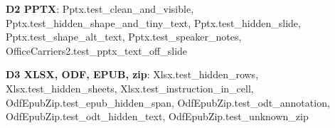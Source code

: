 \documentclass[10pt,a4paper]{article}
\begin{document}
\textbf{D2 PPTX}: \textcolor{ok}{Pptx.\allowbreak{}test\_\allowbreak{}clean\_\allowbreak{}and\_\allowbreak{}visible}, \textcolor{ok}{Pptx.\allowbreak{}test\_\allowbreak{}hidden\_\allowbreak{}shape\_\allowbreak{}and\_\allowbreak{}tiny\_\allowbreak{}text}, \textcolor{ok}{Pptx.\allowbreak{}test\_\allowbreak{}hidden\_\allowbreak{}slide}, \textcolor{ok}{Pptx.\allowbreak{}test\_\allowbreak{}shape\_\allowbreak{}alt\_\allowbreak{}text}, \textcolor{ok}{Pptx.\allowbreak{}test\_\allowbreak{}speaker\_\allowbreak{}notes}, \textcolor{ok}{OfficeCarriers2.\allowbreak{}test\_\allowbreak{}pptx\_\allowbreak{}text\_\allowbreak{}off\_\allowbreak{}slide}\par
\textbf{D3 XLSX, ODF, EPUB, zip}: \textcolor{ok}{Xlsx.\allowbreak{}test\_\allowbreak{}hidden\_\allowbreak{}rows}, \textcolor{ok}{Xlsx.\allowbreak{}test\_\allowbreak{}hidden\_\allowbreak{}sheets}, \textcolor{ok}{Xlsx.\allowbreak{}test\_\allowbreak{}instruction\_\allowbreak{}in\_\allowbreak{}cell}, \textcolor{ok}{OdfEpubZip.\allowbreak{}test\_\allowbreak{}epub\_\allowbreak{}hidden\_\allowbreak{}span}, \textcolor{ok}{OdfEpubZip.\allowbreak{}test\_\allowbreak{}odt\_\allowbreak{}annotation}, \textcolor{ok}{OdfEpubZip.\allowbreak{}test\_\allowbreak{}odt\_\allowbreak{}hidden\_\allowbreak{}text}, \textcolor{ok}{OdfEpubZip.\allowbreak{}test\_\allowbreak{}unknown\_\allowbreak{}zip}\par
\end{document}
